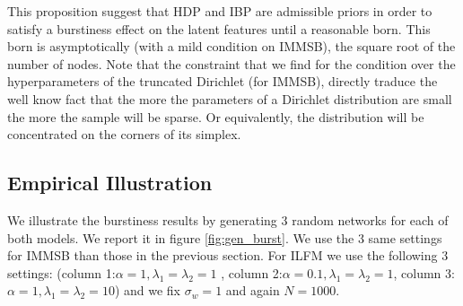 This proposition suggest that HDP and IBP are admissible priors in order to satisfy a burstiness effect on the latent features until a reasonable born. This born is asymptotically  (with a mild condition on IMMSB), the square root of the number of nodes. Note that the constraint that we find for the condition over the hyperparameters of the truncated Dirichlet (for IMMSB), directly traduce the well know fact that the more the parameters of a Dirichlet distribution are small the more the sample will be sparse. Or equivalently, the distribution will be concentrated on the corners of its simplex.

\subsection{Empirical Illustration}

We illustrate the burstiness results by generating 3 random networks for each of both models. We report it in figure \ref{fig:gen_burst}. We use the 3 same settings for IMMSB  than those in the previous section. For ILFM  we use the following 3 settings: (column 1:$\alpha=1,  \lambda_1=\lambda_2=1$ , column 2:$\alpha=0.1, \lambda_1=\lambda_2=1$, column 3: $\alpha=1, \lambda_1=\lambda_2=10$) and we fix $\sigma_w=1$ and again $N=1000$.

